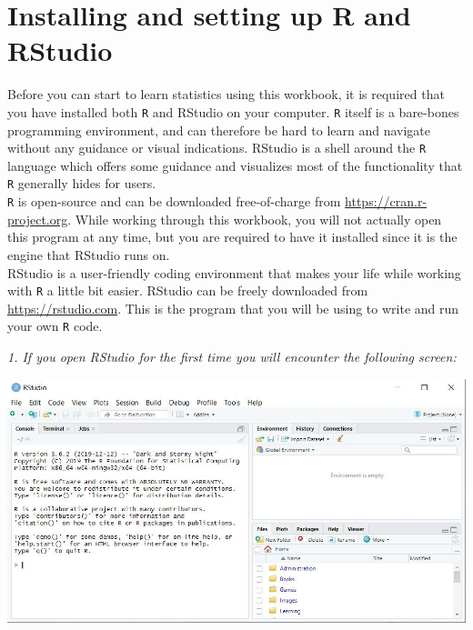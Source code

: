 \thispagestyle{emptyhead}

\section{Installing and setting up R and RStudio}

Before you can start to learn statistics using this workbook, it is required that you have installed both \texttt{R} and RStudio on your computer. \texttt{R} itself is a bare-bones programming environment, and can therefore be hard to learn and navigate without any guidance or visual indications. RStudio is a shell around the \texttt{R} language which offers some guidance and visualizes most of the functionality that \texttt{R} generally hides for users.\\

\texttt{R} is open-source and can be downloaded free-of-charge from \url{https://cran.r-project.org}. While working through this workbook, you will not actually open this program at any time, but you are required to have it installed since it is the engine that RStudio runs on. \\

RStudio is a user-friendly coding environment that makes your life while working with \texttt{R} a little bit easier. RStudio can be freely downloaded from \url{https://rstudio.com}. This is the program that you will be using to write and run your own \texttt{R} code. \\

\vspace*{1cm}

\begin{minipage}{0.4\textwidth}
\textit{1. If you open RStudio for the first
time you will encounter the
following screen:}
\end{minipage}%
\hfill%
\begin{minipage}{0.55\textwidth}
\includegraphics[width=\linewidth]{Files/Images/setup1.jpg}
\end{minipage} \\
\\
\bigskip

